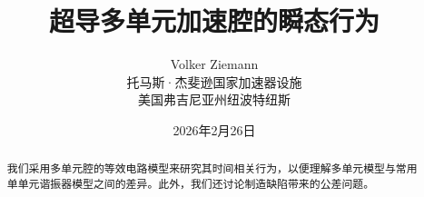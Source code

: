 \documentclass[12pt]{article}
\begin{document}
\title{超导多单元加速腔的瞬态行为}
\author{Volker Ziemann\\ 托马斯·杰斐逊国家加速器设施\\
  美国弗吉尼亚州纽波特纽斯}
\date{2026年2月26日}
\maketitle
\begin{abstract}\noindent
  我们采用多单元腔的等效电路模型来研究其时间相关行为，以便理解多单元模型与常用单单元谐振器模型之间的差异。此外，我们还讨论制造缺陷带来的公差问题。
\end{abstract}
%
%
\end{document}
